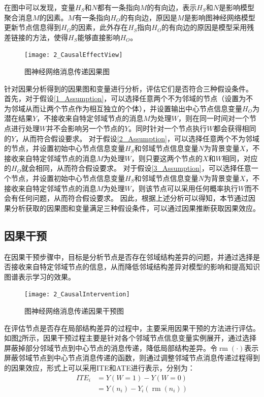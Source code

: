 \documentclass[algorithmlist, AutoFakeBold, AutoFakeSlant, figurelist, tablelist, nomlist, engineering]{seuthesix}
\begin{document}
在图中可以发现，变量$H_S$和$N$都有一条指向$M$的有向边，表示$H_S$和$N$是影响模型聚合消息$M$的因素。$M$有一条指向$H_O$的有向边，原因是$M$是影响图神经网络模型更新节点信息得到$H_O$的因素，此外存在$H_S$指向$H_O$的有向边的原因是模型采用残差链接的方法，使得$H_S$能够直接影响$H_O$。
\begin{figure}
  \centering
  \texttt{[image: 2\_CausalEffectView]}
  \caption{图神经网络消息传递因果图}
  \label{2_CausalEffectView}
\end{figure}

针对因果分析得到的因果图和变量进行分析，评估它们是否符合三种假设条件。
首先，对于假设\ref{1_Assumption}，可以选择任意两个不为邻域的节点（设置为不为邻域从而让两个节点作为相互独立的个体），并设置输出中心节点信息变量$H_O$为潜在结果$Y$，不接收来自特定邻域节点的消息$M$为处理$W$，则在同一时间对一个节点进行处理$W$并不会影响另一个节点的$Y$。同时针对一个节点执行$W$都会获得相同的$Y$，从而符合假设要求。
对于假设\ref{2_Assumption}，可以选择任意两个不为邻域的节点，并设置初始中心节点信息变量$H_S$和邻域节点信息变量$N$为背景变量$X$，不接收来自特定邻域节点的消息$M$为处理$W$，则只要这两个节点的$X$和$W$相同，对应的$H_O$就会相同，从而符合假设要求。
对于假设\ref{3_Assumption}，可以选择任意一个节点，并设置初始中心节点信息变量$H_S$和邻域节点信息变量$N$为背景变量$X$，不接收来自特定邻域节点的消息$M$为处理$W$，则该节点可以采用任何概率执行$W$而不会有任何问题，从而符合假设要求。
因此，根据上述分析可以得知，本节通过因果分析获取的因果图和变量满足三种假设条件，可以通过因果推断获取因果效应。

\subsection{因果干预}
在因果干预步骤中，目标是分析节点是否存在邻域结构差异的问题，并通过选择是否接收来自特定邻域节点的信息，从而降低邻域结构差异对模型的影响和提高知识图谱表示学习的效果。
\begin{figure}
  \centering
  \texttt{[image: 2\_CausalIntervention]}
  \caption{图神经网络消息传递因果干预图}
  \label{2_CausalIntervention}
\end{figure}

在评估节点是否存在局部结构差异的过程中，主要采用因果干预的方法进行评估。如图\ref{2_CausalIntervention}所示，因果干预过程主要是针对各个邻域节点信息变量实例展开，通过选择屏蔽掉部分邻域节点到中心节点的消息传递，降低局部结构差异。令$\operatorname{rm}(\cdot)$表示屏蔽邻域节点到中心节点消息传递的函数，则通过调整邻域节点消息传递过程得到的因果效应，形式上可以采用ITE和ATE进行表示，分别为：
\begin{equation}
  \begin{aligned}
    ITE_i & =Y(W=1) - Y(W=0) \\
    & =Y(n_i)-Y_i(\operatorname{rm}(n_i))
  \end{aligned}
  \label{equation_CausalInterventionITE}
\end{equation}
\end{document}
